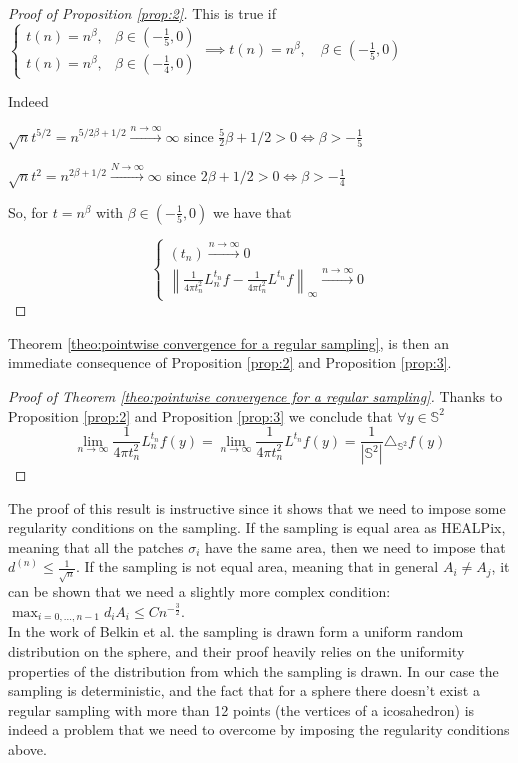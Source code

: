 \documentclass{article} %
\newcommand{\norm}[1]{\left\lVert#1\right\rVert}
\begin{document}
\begin{proof}[Proof of Proposition \ref{prop:2}]
This is true if $\begin{cases}
t(n) = n^\beta, &\beta\in(-\frac{1}{5}, 0) \\
t(n) = n^\beta, &\beta\in(-\frac{1}{4}, 0)
\end{cases} \implies t(n) = n^\beta, \quad \beta\in(-\frac{1}{5}, 0)$

Indeed

$\sqrt{n}t^{5/2}=n^{5/2\beta+1/2}\xrightarrow{n \to \infty} \infty$ since $\frac{5}{2}\beta+1/2>0 \iff \beta>-\frac{1}{5}$

$\sqrt{n}t^2=n^{2\beta+1/2}\xrightarrow {N \to \infty} \infty$ since $2\beta+1/2>0 \iff \beta>-\frac{1}{4}$

So, for $t=n^\beta$ with $\beta\in(-\frac{1}{5}, 0)$ we have that

$$\begin{cases}
(t_n)\xrightarrow{n\to\infty}0\\
\norm{\frac{1}{4\pi t_n^2}L_n^{t_n}f-\frac{1}{4\pi t_n^2}L^{t_n}f}_\infty  \xrightarrow{n\to\infty}0
\end{cases}$$

\end{proof}


Theorem  \ref{theo:pointwise convergence for a regular sampling}, is then an immediate consequence of Proposition \ref{prop:2} and Proposition \ref{prop:3}.
\begin{proof}[Proof of Theorem \ref{theo:pointwise convergence for a regular sampling}]
	Thanks to Proposition \ref{prop:2} and Proposition \ref{prop:3}	we conclude that $\forall y\in\mathbb S^2 $
	$$\lim_{n\to\infty}\frac{1}{4\pi t_n^2} L_n^{t_n}f(y) =  \lim_{n\to\infty}\frac{1}{4\pi t_n^2} L^{t_n}f(y) = \frac{1}{|\mathbb S^2|}\triangle_{\mathbb S^2}f(y) $$
\end{proof}

The proof of this result is instructive since it shows that we need to impose some regularity conditions on the sampling. If the sampling is equal area as HEALPix, meaning that all the patches $\sigma_i$ have the same area, then we need to impose that $ d^{(n)}\leq \frac{1}{\sqrt{n}}$. If the sampling is not equal area, meaning that in general $A_i\neq A_j$, it can be shown that we need a slightly more complex condition: $\max_{i=0,\dots,n-1}d_iA_i\leq Cn^{-\frac{3}{2}}$.\\
In the work of Belkin et al. \cite{belkin2005towards} the sampling is drawn form a uniform random distribution on the sphere, and their proof heavily relies on the uniformity properties of the distribution from which the sampling is drawn. In our case the sampling is deterministic, and the fact that for a sphere there doesn't exist a regular sampling with more than 12 points (the vertices of a icosahedron) is indeed a problem that we need to overcome by imposing the regularity conditions above.
\end{document}
